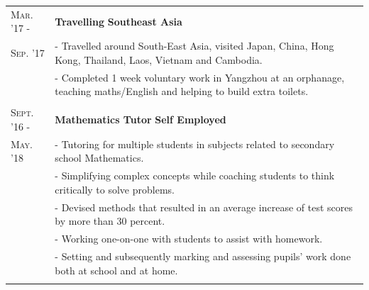 \documentclass[a4paper,10pt]{extarticle} %
\begin{document}
{\begin{tabularx}{\linewidth}{ l | X }
\textsc{Mar. '17 -} & \textbf{Travelling} \hfill\textbf{Southeast Asia}\\
\textsc{Sep. '17}
& {- Travelled around South-East Asia, visited Japan, China, Hong Kong, Thailand, Laos, Vietnam and Cambodia.}\\
& {- Completed 1 week voluntary work in Yangzhou at an orphanage, teaching maths/English and helping to build extra toilets. }\\
\multicolumn{1}{c}{} \\


\textsc{Sept. '16 -} & \textbf{Mathematics Tutor} \hfill\textbf{Self Employed}\\
\textsc{May. '18 } & {- Tutoring for multiple students in subjects related to secondary school Mathematics. }\\
& {- Simplifying complex concepts while coaching students to think critically to solve problems. }\\
& {- Devised methods that resulted in an average increase of test scores by more than 30 percent. }\\
& {- Working one-on-one with students to assist with homework. }\\
& {- Setting and subsequently marking and assessing pupils’ work done both at school and at home. }\\
\multicolumn{1}{c}{} \\


\end{tabularx}}
\end{document}
